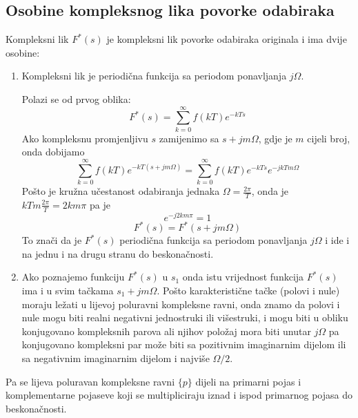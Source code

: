 \documentclass{article}
\begin{document}
	\subsection*{Osobine kompleksnog lika povorke odabiraka}
	Kompleksni lik $F^*(s)$ je kompleksni lik povorke odabiraka originala i ima dvije osobine:
	\begin{enumerate}
		\item Kompleksni lik je periodična funkcija sa periodom ponavljanja $j\Omega$.
		
		Polazi se od prvog oblika:
		$$F^*(s) = \sum_{k=0}^\infty f(kT)e^{-kTs}$$
		Ako kompleksnu promjenljivu $s$ zamijenimo sa $s+jm\Omega$, gdje je $m$ cijeli broj, onda dobijamo
		$$\sum_{k=0}^\infty f(kT)e^{-kT(s+jm\Omega)} = \sum_{k=0}^\infty f(kT)e^{-kTs}e^{-jkTm\Omega}$$
		Pošto je kružna učestanost odabiranja jednaka $\Omega = \frac{2\pi}{T}$, onda je $kTm\frac{2\pi}{T}=2km\pi$ pa je
		$$e^{-j2km\pi} = 1$$
		$$F^*(s) = F^*(s+jm\Omega)$$
		To znači da je $F^*(s)$ periodična funkcija sa periodom ponavljanja $j\Omega$ i ide i na jednu i na drugu stranu do beskonačnosti.
		\item Ako poznajemo funkciju $F^*(s)$ u $s_1$ onda istu vrijednost funkcija $F^*(s)$ ima i u svim tačkama $s_1+jm\Omega$. Pošto karakteristične tačke (polovi i nule) moraju ležati u lijevoj poluravni kompleksne ravni, onda znamo da polovi i nule mogu biti realni negativni jednostruki ili višestruki, i mogu biti u obliku konjugovano kompleksnih parova ali njihov položaj mora biti unutar $j\Omega$ pa konjugovano kompleksni par može biti sa pozitivnim imaginarnim dijelom ili sa negativnim imaginarnim dijelom i najviše $\Omega/2$. %
	\end{enumerate}
	Pa se lijeva poluravan kompleksne ravni $\{p\}$ dijeli na primarni pojas i komplementarne pojaseve koji se multipliciraju iznad i ispod primarnog pojasa do beskonačnosti.
\end{document}
